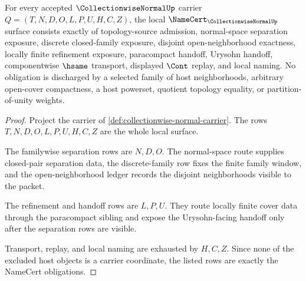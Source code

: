 \begin{theorem}
\label{thm:collectionwise-normal-namecert-obligations}
For every accepted $\CollectionwiseNormalUp$ carrier $Q=(T,N,D,O,L,P,U,H,C,Z)$, the local $\NameCert_{\CollectionwiseNormalUp}$ surface consists exactly of topology-source admission, normal-space separation exposure, discrete closed-family exposure, disjoint open-neighborhood exactness, locally finite refinement exposure, paracompact handoff, Urysohn handoff, componentwise $\hsame$ transport, displayed $\Cont$ replay, and local naming. No obligation is discharged by a selected family of host neighborhoods, arbitrary open-cover compactness, a host powerset, quotient topology equality, or partition-of-unity weights.
\end{theorem}
\begin{proof}
Project the carrier of \autoref{def:collectionwise-normal-carrier}. The rows $T,N,D,O,L,P,U,H,C,Z$ are the whole local surface.

The familywise separation rows are $N,D,O$. The normal-space route supplies closed-pair separation data, the discrete-family row fixes the finite family window, and the open-neighborhood ledger records the disjoint neighborhoods visible to the packet.

The refinement and handoff rows are $L,P,U$. They route locally finite cover data through the paracompact sibling and expose the Urysohn-facing handoff only after the separation rows are visible.

Transport, replay, and local naming are exhausted by $H,C,Z$. Since none of the excluded host objects is a carrier coordinate, the listed rows are exactly the NameCert obligations.
\end{proof}


